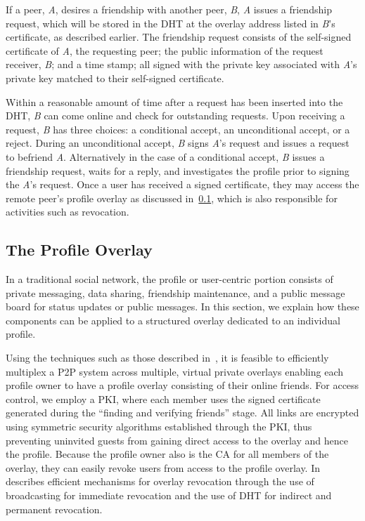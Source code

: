\documentclass[conference]{IEEEtran}
\begin{document}
If a peer, \textit{A}, desires a friendship with another peer, \textit{B},
\textit{A} issues a friendship request, which will be stored in the DHT at the
overlay address listed in \textit{B}'s certificate, as described earlier.  The
friendship request consists of the self-signed certificate of \textit{A}, the
requesting peer; the public information of the request receiver, \textit{B};
and a time stamp; all signed with the private key associated with \textit{A}'s
private key matched to their self-signed certificate.

Within a reasonable amount of time after a request has been inserted into the
DHT, \textit{B} can come online and check for outstanding requests.  Upon
receiving a request, \textit{B} has three choices: a conditional accept, an
unconditional accept, or a reject.  During an unconditional accept, \textit{B}
signs \textit{A}'s request and issues a request to befriend \textit{A}.
Alternatively in the case of a conditional accept, \textit{B} issues a
friendship request, waits for a reply, and investigates the profile prior to
signing the \textit{A}'s request.  Once a user has received a signed
certificate, they may access the remote peer's profile overlay as discussed
in~\ref{profile_overlay}, which is also responsible for activities such as
revocation.

\subsection{The Profile Overlay}
\label{profile_overlay}

In a traditional social network, the profile or user-centric portion consists
of private messaging, data sharing, friendship maintenance, and a public
message board for status updates or public messages.  In this section, we
explain how these components can be applied to a structured overlay dedicated
to an individual profile.

Using the techniques such as those described in~\cite{vpo}, it is feasible to
efficiently multiplex a P2P system across multiple, virtual private overlays
enabling each profile owner to have a profile overlay consisting of their
online friends.  For access control, we employ a PKI, where each member uses
the signed certificate generated during the ``finding and verifying friends''
stage.  All links are encrypted using symmetric security algorithms
established through the PKI, thus preventing uninvited guests from gaining
direct access to the overlay and hence the profile.  Because the profile owner
also is the CA for all members of the overlay, they can easily revoke users
from access to the profile overlay.  In~\cite{vpo} describes efficient
mechanisms for overlay revocation through the use of broadcasting for
immediate revocation and the use of DHT for indirect and permanent revocation.
\end{document}
